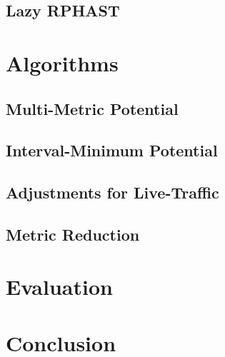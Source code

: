 \documentclass[a4paper,UKenglish,cleveref, autoref, thm-restate]{lipics-v2021}
\begin{document}
\subsection{Lazy RPHAST}

\section{Algorithms}
\subsection{Multi-Metric Potential}
\subsection{Interval-Minimum Potential}
\subsection{Adjustments for Live-Traffic}
\subsection{Metric Reduction}
\section{Evaluation}
\section{Conclusion}


\end{document}
